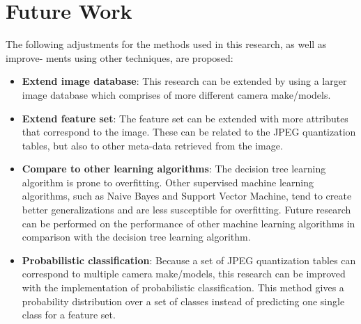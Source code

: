 \section{Future Work}\label{sec:fut}
The following adjustments for the methods used in this research, as well as improve-
ments using other techniques, are proposed:
\begin{itemize}
\item \textbf{Extend image database}: This research can be extended by using a larger image database which comprises of more different camera make/models.
\item \textbf{Extend feature set}: The feature set can be extended with more attributes that correspond to the image. These can be related to the JPEG quantization tables, but also to other meta-data retrieved from the image.
\item \textbf{Compare to other learning algorithms}: The decision tree learning algorithm is prone to overfitting. Other supervised machine learning algorithms, such as Naive Bayes and Support Vector Machine, tend to create better generalizations and are less susceptible for overfitting. Future research can be performed on the performance of other machine learning algorithms in comparison with the decision tree learning algorithm.
\item \textbf{Probabilistic classification}: Because a set of JPEG quantization tables can correspond to multiple camera make/models, this research can be improved with the implementation of probabilistic classification. This method gives a probability distribution over a set of classes instead of predicting one single class for a feature set.

\end{itemize}
\iffalse
